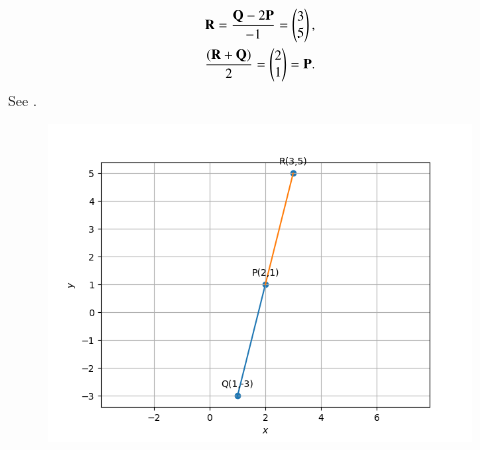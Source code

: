 \begin{align}
\mathbf{R} = \frac{\mathbf{Q} -2\mathbf{P}}{-1} 
= \begin{pmatrix}3\\5\end{pmatrix},
\\
\frac{ (\mathbf{R} + \mathbf{Q})}{2}
=\begin{pmatrix}2\\1\end{pmatrix} =\mathbf{P}.
\end{align}
See 
.
\begin{figure}[!h]
	\begin{center}
		\includegraphics[width=\columnwidth]{chapters/12/10/5/9/figs/line.png}
	\end{center}
\caption{}
\label{fig:chapters/12/10/5/9/Figure1}
\end{figure}

